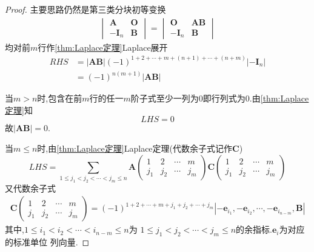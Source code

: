 {\begin{proof}
        主要思路仍然是第三类分块初等变换
        \begin{align*}
            \begin{vmatrix}
                \bm{A}    & \bm{O} \\
                -\bm{I}_n & \bm{B}
            \end{vmatrix}=\begin{vmatrix}
                              \bm{O}    & \bm{AB} \\
                              -\bm{I}_n & \bm{B}
                          \end{vmatrix}
        \end{align*}
        均对前$m$行作\cref{thm:Laplace定理}Laplace展开
        \begin{align*}
            RHS & =\left|\bm{AB}\right|\left(-1\right)^{
                1+2+\cdots+m+\left(n+1\right)+\cdots+\left(n+m\right)
            }\left|-\bm{I}_n\right|                                        \\
                & =\left(-1\right)^{n\left(m+1\right)}\left|\bm{AB}\right|
        \end{align*}

        当$m>n$时,包含在前$m$行的任一$m$阶子式至少一列为$0$即行列式为$0$.由\cref{thm:Laplace定理}知
        \[
            LHS = 0
        \]
        故$\left|\bm{AB}\right|=0$.

        当$m\leqslant n$时,由\cref{thm:Laplace定理}Laplace定理(代数余子式记作$\bm{C}$)
        \[
            LHS =\sum_{1\leqslant j_1<j_2<\cdots<j_m\leqslant n}\bm{A}\begin{pmatrix}
                1   & 2   & \cdots & m   \\
                j_1 & j_2 & \cdots & j_m
            \end{pmatrix}\bm{C}\begin{pmatrix}
                1   & 2   & \cdots & m   \\
                j_1 & j_2 & \cdots & j_m
            \end{pmatrix}
        \]
        又代数余子式
        \begin{align*}
            \bm{C}\begin{pmatrix}
                      1   & 2   & \cdots & m   \\
                      j_1 & j_2 & \cdots & j_m
                  \end{pmatrix}=\left(-1
            \right)^{1+2+\cdots+m+j_1
                +j_2+\cdots+j_m}\left|-\bm{e}_{i_1},-\bm{e}_{i_2},\cdots,-\bm{e}_{i_{n-m}},\bm{B}\right|
        \end{align*}
        其中,$1\leqslant i_1<i_2<\cdots<i_{n-m}\leqslant n$为
        $1\leqslant j_1<j_2<\cdots<j_m
            \leqslant n$的余指标.$
            \bm{e}_i$为对应的标准单位
        列向量.


\end{proof}}
